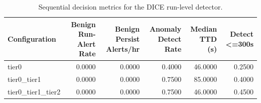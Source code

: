 \begin{table}[t]
\centering
\caption{Sequential decision metrics for the DICE run-level detector.}
\label{tab:dice_sequential_metrics}
\footnotesize
\begin{tabular}{lrrrrr}
\toprule
Configuration & Benign Run-Alert Rate & Benign Persist Alerts/hr & Anomaly Detect Rate & Median TTD (s) & Detect <=300s \\
\midrule
tier0 & 0.0000 & 0.0000 & 0.4000 & 46.0000 & 0.2500 \\
tier0_tier1 & 0.0000 & 0.0000 & 0.7500 & 85.0000 & 0.4000 \\
tier0_tier1_tier2 & 0.0000 & 0.0000 & 0.7500 & 46.0000 & 0.4500 \\
\bottomrule
\end{tabular}

\end{table}
